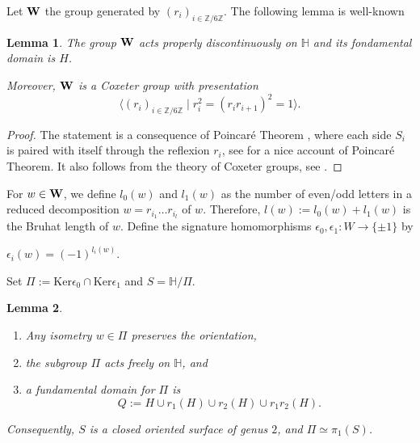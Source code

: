 \documentclass[10pt,a4paper]{amsart}
\newcommand{\HP}{\mathbb{H}}
\newcommand{\Z}{\mathbb{Z}}
\newcommand{\Ker}{\mathrm{Ker}}
\newtheorem{lemma}{Lemma}
\begin{document}
Let ${\bf W}$ the group generated by $(r_i)_{i\in\Z/6\Z}$.
The following lemma is well-known

\begin{lemma} 
The group ${\bf W}$ acts properly discontinuously
on $\HP$ and its fondamental domain is $H$.

Moreover, ${\bf W}$ is a Coxeter group with presentation
$$\langle (r_i)_{i\in\Z/6\Z} \mid 
r_i^2=
(r_i r_{i+1})^2=1\rangle.$$
\end{lemma}

\begin{proof} The statement is a consequence of Poincar\'e
Theorem \cite{Poincare}, where each side $S_i$ is paired with itself through the
reflexion $r_i$, see \cite{Maskit} for a  nice account of
Poincar\'e Theorem. It also follows from the theory of Coxeter groups, see
\cite{Davis}.
\end{proof}






For $w\in {\bf W}$, we define $l_0(w)$ and $l_1(w)$ as  the number of  even/odd letters in a reduced decomposition $w=r_{i_1}\dots r_{i_l}$ of $w$. Therefore,
$l(w):=l_0(w)+l_1(w)$ is the Bruhat length of $w$. Define the signature homomorphisms
$\epsilon_0, \epsilon_1:W\to\{\pm 1\}$ by 

\centerline{$\epsilon_i(w)=(-1)^{l_i(w)}$.}

Set  $\Pi:=\Ker\epsilon_0\cap\Ker\epsilon_1$ and $S=\HP/\Pi$.

\begin{lemma} \label{fundamental}

\begin{enumerate}
\item[(a)] Any isometry $w\in \Pi$ preserves the orientation,
\item[(b)] the subgroup $\Pi$ acts freely on $\HP$, and 
\item[(c)] a  fundamental domain for $\Pi$ is 
$$Q:= H\cup r_1(H)\cup r_2(H)\cup r_1r_2(H).$$
\end{enumerate}

Consequently, $S$ is a closed oriented surface of genus $2$, and
$\Pi\simeq \pi_1(S)$.
\end{lemma}
\end{document}
